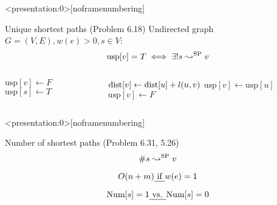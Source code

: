 
\begin{frame}
  \centerline{}
\end{frame}

\begin{frame}{}
  \begin{columns}
      
    \pause
  \end{columns}
\end{frame}

\begin{frame}<presentation:0>[noframenumbering]
  \begin{exampleblock}{Unique shortest paths (Problem 6.18)}
    Undirected graph $G = (V, E), w(e) > 0, s \in V$:
    \[
      \text{usp}[v] = T \iff \exists! s \leadsto^{\text{SP}} v 
    \]
  \end{exampleblock}

  \begin{columns}[t]
      \begin{algorithmic}
	  \State $\text{usp}[v] \gets F$
	\EndFor
	\State $\text{usp}[s] \gets T$
      \end{algorithmic}
      \begin{algorithmic}
	  \State $\text{dist}[v] \gets \text{dist}[u] + l(u,v)$
	  \State $\text{usp}[v] \gets \text{usp}[u]$
	  \State $\text{usp}[v] \gets F$
	\EndIf
      \end{algorithmic}
  \end{columns}
\end{frame}
\begin{frame}<presentation:0>[noframenumbering]
  \begin{exampleblock}{Number of shortest paths (Problem 6.31, 5.26)}
    \[
      \# s \leadsto^{\text{SP}} v
    \]

    \[
      O(n + m) \text{\emph{ if }} w(e) = 1
    \]
  \end{exampleblock}

  \[
    \text{Num}[s] = 1 \text{\emph{ vs. }} \text{Num}[s] = 0
  \]
\end{frame}

